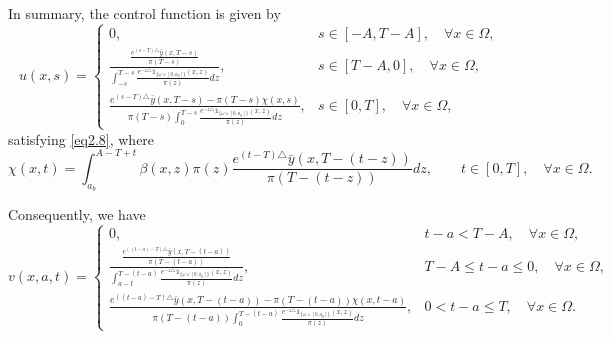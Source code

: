 \documentclass[10pt,a4paper]{amsart}
\makeatletter
\renewenvironment{proof}[1][\proofname]{\par
  \pushQED{\qed}%
  \normalfont \topsep6\p@\@plus6\p@\relax
  \trivlist
  \item[\hskip\labelsep
        \itshape
    #1\ \ref{#1}.]\ignorespaces
}{%
  \popQED\endtrivlist\@endpefalse
}
\makeatother
\begin{document}
\begin{proof}[of Proposition \ref{pr2.3}]
In summary, the control function is given by  
\begin{equation}
u(x,s) =
\begin{cases}
0, & s \in [-A,T-A], \quad \forall x \in \Omega, \\
\frac{\frac{e^{(s-T)\triangle} \bar{y}(x,T-s)}{\pi(T-s)}}{\int_{-s}^{T-s} \frac{e^{-z\triangle} \mathds{1}_{\lbrace\omega\times[0,a_0]\rbrace}(x,z)}{\pi(z)} dz}, & s \in [T-A,0], \quad \forall x \in \Omega, \\
\frac{e^{(s-T)\triangle} \bar{y}(x,T-s) - \pi(T-s) \chi(x,s)}{\pi(T-s) \int_{0}^{T-s} \frac{e^{-z\triangle} \mathds{1}_{\lbrace\omega\times[0,a_0]\rbrace}(x,z)}{\pi(z)} dz}, & s \in [0,T], \quad \forall x \in \Omega,
\end{cases}
\end{equation}  
satisfying \eqref{eq2.8}, where  
\begin{equation}
\chi(x,t) = \int_{a_b}^{A-T+t} \beta(x,z) \pi(z) \frac{e^{(t-T)\triangle} \bar{y}(x,T-(t-z))}{\pi(T-(t-z))} dz, \qquad t \in [0,T], \quad \forall x \in \Omega.
\end{equation}  

Consequently, we have  
\begin{equation}
v(x,a,t) =
\begin{cases}
0, & t-a<T-A, \quad \forall x \in \Omega, \\
\frac{\frac{e^{((t-a)-T)\triangle} \bar{y}(x,T-(t-a))}{\pi(T-(t-a))}}{\int_{a-t}^{T-(t-a)} \frac{e^{-z\triangle} \mathds{1}_{\lbrace\omega\times[0,a_0]\rbrace}(x,z)}{\pi(z)} dz}, & T-A \leq t-a \leq 0, \quad \forall x \in \Omega, \\
\frac{e^{((t-a)-T)\triangle} \bar{y}(x,T-(t-a)) - \pi(T-(t-a)) \chi(x,t-a)}{\pi(T-(t-a)) \int_{0}^{T-(t-a)} \frac{e^{-z\triangle} \mathds{1}_{\lbrace\omega\times[0,a_0]\rbrace}(x,z)}{\pi(z)} dz}, & 0 < t-a \leq T, \quad \forall x \in \Omega.
\end{cases}
\end{equation}  


\end{proof}
\end{document}
